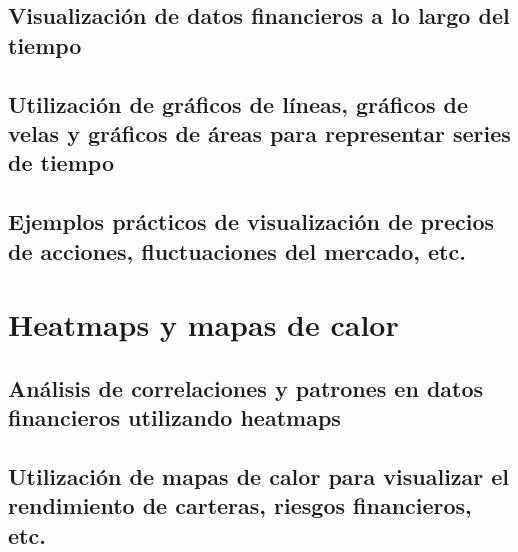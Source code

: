 \documentclass[
  a4paper,
]{article}
\begin{document}
\hypertarget{visualizaciuxf3n-de-datos-financieros-a-lo-largo-del-tiempo}{%
\subsection{Visualización de datos financieros a lo largo del
tiempo}\label{visualizaciuxf3n-de-datos-financieros-a-lo-largo-del-tiempo}}

\hypertarget{utilizaciuxf3n-de-gruxe1ficos-de-luxedneas-gruxe1ficos-de-velas-y-gruxe1ficos-de-uxe1reas-para-representar-series-de-tiempo}{%
\subsection{Utilización de gráficos de líneas, gráficos de velas y
gráficos de áreas para representar series de
tiempo}\label{utilizaciuxf3n-de-gruxe1ficos-de-luxedneas-gruxe1ficos-de-velas-y-gruxe1ficos-de-uxe1reas-para-representar-series-de-tiempo}}

\hypertarget{ejemplos-pruxe1cticos-de-visualizaciuxf3n-de-precios-de-acciones-fluctuaciones-del-mercado-etc.}{%
\subsection{Ejemplos prácticos de visualización de precios de acciones,
fluctuaciones del mercado,
etc.}\label{ejemplos-pruxe1cticos-de-visualizaciuxf3n-de-precios-de-acciones-fluctuaciones-del-mercado-etc.}}

\hypertarget{heatmaps-y-mapas-de-calor}{%
\section{Heatmaps y mapas de calor}\label{heatmaps-y-mapas-de-calor}}

\hypertarget{anuxe1lisis-de-correlaciones-y-patrones-en-datos-financieros-utilizando-heatmaps}{%
\subsection{Análisis de correlaciones y patrones en datos financieros
utilizando
heatmaps}\label{anuxe1lisis-de-correlaciones-y-patrones-en-datos-financieros-utilizando-heatmaps}}

\hypertarget{utilizaciuxf3n-de-mapas-de-calor-para-visualizar-el-rendimiento-de-carteras-riesgos-financieros-etc.}{%
\subsection{Utilización de mapas de calor para visualizar el rendimiento
de carteras, riesgos financieros,
etc.}\label{utilizaciuxf3n-de-mapas-de-calor-para-visualizar-el-rendimiento-de-carteras-riesgos-financieros-etc.}}
\end{document}
